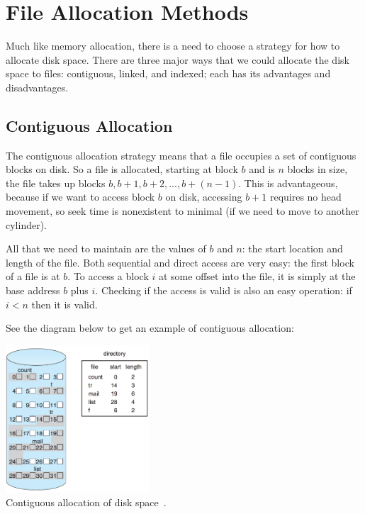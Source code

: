 




\section*{File Allocation Methods}

Much like memory allocation, there is a need to choose a strategy for how to allocate disk space. There are three major ways that we could allocate the disk space to files: contiguous, linked, and indexed; each has its advantages and disadvantages.

\subsection*{Contiguous Allocation}
The contiguous allocation strategy means that a file occupies a set of contiguous blocks on disk. So a file is allocated, starting at block $b$ and is $n$ blocks in size, the file takes up blocks $b, b+1, b+2, ..., b+(n-1)$. This is advantageous, because if we want to access block $b$ on disk, accessing $b+1$ requires no head movement, so seek time is nonexistent to minimal (if we need to move to another cylinder). 

All that we need to maintain are the values of $b$ and $n$: the start location and length of the file. Both sequential and direct access are very easy: the first block of a file is at $b$. To access a block $i$ at some offset into the file, it is simply at the base address $b$ plus $i$. Checking if the access is valid is also an easy operation: if $i < n$ then it is valid.

See the diagram below to get an example of contiguous allocation:
\begin{center}
	\includegraphics[width=0.4\textwidth]{images/disk-contiguous.png}\\
	Contiguous allocation of disk space~\cite{osc}.
\end{center}

